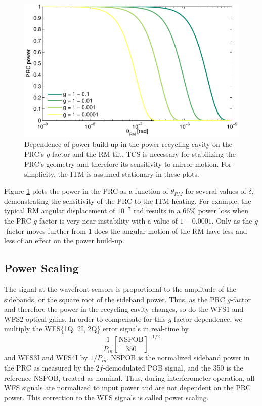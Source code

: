 \begin{figure}
\begin{centering}
\includegraphics[width=1.0\columnwidth]{figures/prc_power.pdf}
\caption[Theoretical dependence of power recycling cavity power on
$g$-factor and mirror angle]{Dependence of power build-up in the power
  recycling cavity on the PRC's $g$-factor and the RM tilt. TCS is
  necessary for stabilizing the PRC's geometry and therefore its
  sensitivity to mirror motion. For simplicity, the ITM is assumed
  stationary in these plots.}
\label{fig:prc_power}
\end{centering}
\end{figure}

Figure \ref{fig:prc_power} plots the power in the PRC as a function of
$\theta_{RM}$ for several values of $\delta$, demonstrating
the sensitivity of the PRC to the ITM heating.  For example, the
typical RM angular displacement of $10^{-7}$ rad results in a 66\%
power loss when the PRC $g$-factor is very near instability with a
value of $1-0.0001$. Only as the $g$-factor moves further from $1$
does the angular motion of the RM have less and less of an effect on
the power build-up.



\subsection{Power Scaling}
\label{sec:powerscaling}
The signal at the wavefront sensors is proportional to the amplitude
of the sidebands, or the square root of the sideband power. Thus, as
the PRC $g$-factor and therefore the power in the recycling cavity
changes, so do the WFS1 and WFS2 optical gains. In order to
compensate for this $g$-factor dependence, we multiply the WFS\{1Q,
2I, 2Q\} error signals in real-time by
\begin{equation}
\frac{1}{P_{in}} \left[\frac{\mathrm{NSPOB}}{350}\right]^{-1/2}
\end{equation}
and WFS3I and WFS4I by $1/P_{in}$. NSPOB is the normalized sideband
power in the PRC as measured by the $2f$-demodulated POB signal, and
the 350 is the reference NSPOB, treated as nominal. Thus, during
interferometer operation, all WFS signals are normalized to input
power and are not dependent on the PRC power. This correction to the
WFS signals is called power scaling.

